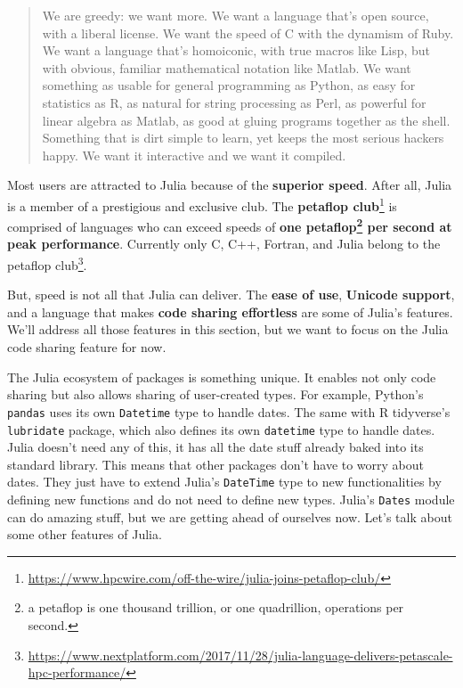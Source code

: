 \documentclass[
  notoc %
]{tufte-book}
\DeclareRobustCommand{\href}[2]{#2\footnote{\url{#1}}}
\newcommand{\passthrough}[1]{#1}
\begin{document}
\begin{quote}
We are greedy: we want more. We want a language that's open source, with
a liberal license. We want the speed of C with the dynamism of Ruby. We
want a language that's homoiconic, with true macros like Lisp, but with
obvious, familiar mathematical notation like Matlab. We want something
as usable for general programming as Python, as easy for statistics as
R, as natural for string processing as Perl, as powerful for linear
algebra as Matlab, as good at gluing programs together as the shell.
Something that is dirt simple to learn, yet keeps the most serious
hackers happy. We want it interactive and we want it compiled.
\end{quote}

Most users are attracted to Julia because of the \textbf{superior
speed}. After all, Julia is a member of a prestigious and exclusive
club. The
\href{https://www.hpcwire.com/off-the-wire/julia-joins-petaflop-club/}{\textbf{petaflop
club}} is comprised of languages who can exceed speeds of \textbf{one
petaflop\footnote{a petaflop is one thousand trillion, or one
  quadrillion, operations per second.} per second at peak performance}.
Currently only C, C++, Fortran, and Julia belong to the
\href{https://www.nextplatform.com/2017/11/28/julia-language-delivers-petascale-hpc-performance/}{petaflop
club}.

But, speed is not all that Julia can deliver. The \textbf{ease of use},
\textbf{Unicode support}, and a language that makes \textbf{code sharing
effortless} are some of Julia's features. We'll address all those
features in this section, but we want to focus on the Julia code sharing
feature for now.

The Julia ecosystem of packages is something unique. It enables not only
code sharing but also allows sharing of user-created types. For example,
Python's \passthrough{\lstinline!pandas!} uses its own
\passthrough{\lstinline!Datetime!} type to handle dates. The same with R
tidyverse's \passthrough{\lstinline!lubridate!} package, which also
defines its own \passthrough{\lstinline!datetime!} type to handle dates.
Julia doesn't need any of this, it has all the date stuff already baked
into its standard library. This means that other packages don't have to
worry about dates. They just have to extend Julia's
\passthrough{\lstinline!DateTime!} type to new functionalities by
defining new functions and do not need to define new types. Julia's
\passthrough{\lstinline!Dates!} module can do amazing stuff, but we are
getting ahead of ourselves now. Let's talk about some other features of
Julia.
\end{document}
